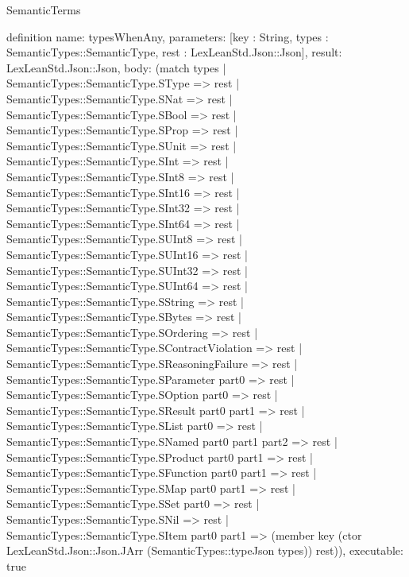 \begin{lexlean}{SemanticTerms}
\begin{semanticmodule}
definition{
  name: typesWhenAny,
  parameters: [key : String, types : SemanticTypes::SemanticType, rest : LexLeanStd.Json::Json],
  result: LexLeanStd.Json::Json,
  body: (match types
    | SemanticTypes::SemanticType.SType => rest
    | SemanticTypes::SemanticType.SNat => rest
    | SemanticTypes::SemanticType.SBool => rest
    | SemanticTypes::SemanticType.SProp => rest
    | SemanticTypes::SemanticType.SUnit => rest
    | SemanticTypes::SemanticType.SInt => rest
    | SemanticTypes::SemanticType.SInt8 => rest
    | SemanticTypes::SemanticType.SInt16 => rest
    | SemanticTypes::SemanticType.SInt32 => rest
    | SemanticTypes::SemanticType.SInt64 => rest
    | SemanticTypes::SemanticType.SUInt8 => rest
    | SemanticTypes::SemanticType.SUInt16 => rest
    | SemanticTypes::SemanticType.SUInt32 => rest
    | SemanticTypes::SemanticType.SUInt64 => rest
    | SemanticTypes::SemanticType.SString => rest
    | SemanticTypes::SemanticType.SBytes => rest
    | SemanticTypes::SemanticType.SOrdering => rest
    | SemanticTypes::SemanticType.SContractViolation => rest
    | SemanticTypes::SemanticType.SReasoningFailure => rest
    | SemanticTypes::SemanticType.SParameter part0 => rest
    | SemanticTypes::SemanticType.SOption part0 => rest
    | SemanticTypes::SemanticType.SResult part0 part1 => rest
    | SemanticTypes::SemanticType.SList part0 => rest
    | SemanticTypes::SemanticType.SNamed part0 part1 part2 => rest
    | SemanticTypes::SemanticType.SProduct part0 part1 => rest
    | SemanticTypes::SemanticType.SFunction part0 part1 => rest
    | SemanticTypes::SemanticType.SMap part0 part1 => rest
    | SemanticTypes::SemanticType.SSet part0 => rest
    | SemanticTypes::SemanticType.SNil => rest
    | SemanticTypes::SemanticType.SItem part0 part1 => (member key (ctor LexLeanStd.Json::Json.JArr (SemanticTypes::typeJson types)) rest)),
  executable: true
}


\end{semanticmodule}
\end{lexlean}
